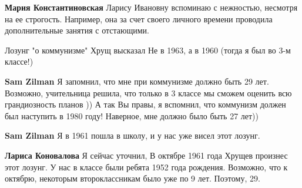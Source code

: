 \begin{itemize}
\begin{itemize}
 
\textbf{Мария Константиновская} Ларису Ивановну вспоминаю с нежностью, несмотря
на ее строгость. Например, она за счет своего личного времени проводила
дополнительные занятия с отстающими.
\end{itemize}

 
Лозунг "о коммунизме" Хрущ высказал Не в 1963, а в 1960 (тогда я был во 3-м
классе!)

\begin{itemize}
 
\textbf{Sam Zilman} Я запомнил, что мне при коммунизме должно быть 29 лет.
Возможно, учительница решила, что только в 3 классе мы сможем оценить всю
грандиозность планов )) А так Вы правы, я вспомнил, что коммунизм должен был
наступить в 1980 году! Наверное, мне должно было быть 27 лет))


 
\textbf{Sam Zilman} Я в 1961 пошла в школу, и у нас уже висел этот лозунг.

\begin{itemize}
 

\textbf{Лариса Коновалова} Я сейчас уточнил, В октябре 1961 года Хрущев
произнес этот лозунг. У нас в классе были ребята 1952 года рождения. Возможно,
что к октябрю, некоторым второклассникам было уже по 9 лет. Поэтому, 29.



\end{itemize}
\end{itemize}
\end{itemize}

